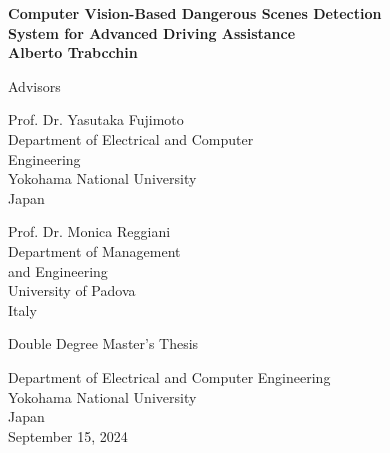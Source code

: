 \begin{titlepage}
\begin{center}

\vspace*{1cm}
\textbf{\Large{Computer Vision-Based Dangerous Scenes Detection}\\ 
        \vspace*{0.2cm}
        \Large{System for Advanced Driving Assistance}}\\
\vspace*{2cm}
\textbf{\large{Alberto Trabcchin}}\\
\vfill

\vspace*{4cm}
Advisors \\
\vspace*{1cm}
\begin{minipage}[t]{0.48\textwidth}
    Prof. Dr. Yasutaka Fujimoto \\
    Department of Electrical and Computer \\ Engineering\\
    Yokohama National University \\
    Japan

\end{minipage}
\hfill
\begin{minipage}[t]{0.48\textwidth}
\begin{flushright}
    Prof. Dr. Monica Reggiani \\
    Department of Management \\ and Engineering \\
    University of Padova \\
    Italy
\end{flushright}
\end{minipage}

\vfill

Double Degree Master's Thesis\\
    
\vspace{0.8cm}

    
Department of Electrical and Computer Engineering\\
Yokohama National University\\
Japan\\
September 15, 2024
            
\end{center}
\end{titlepage}

\afterpage{\blankpage}